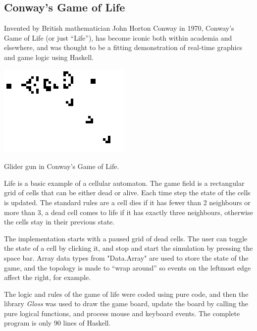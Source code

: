\subsection{Conway's Game of Life}

Invented by British mathematician John Horton Conway in 1970, Conway's Game of Life (or just ``Life''), has become iconic both within academia and elsewhere, and was thought to be a fitting demonstration of real-time graphics and game logic using Haskell. 

\begin{marginfigure}
	\includegraphics{res/conway/conway.png}
	\caption[Glider gun in Conway's Game of Life]{Glider gun in Conway's Game of Life.}
	\label{fig:glidergun}
\end{marginfigure}

Life is a basic example of a cellular automaton. The game field is a rectangular grid of cells that can be either dead or alive. Each time step the state of the cells is updated. The standard rules are a cell dies if it has fewer than 2 neighbours or more than 3, a dead cell comes to life if it has exactly three neighbours, otherwise the cells stay in their previous state.

The implementation starts with a paused grid of dead cells. The user can toggle the state of a cell by clicking it, and stop and start the simulation by pressing the space bar. Array data types from "Data.Array" are used to store the state of the game, and the topology is made to ``wrap around'' so events on the leftmost edge affect the right, for example.

The logic and rules of the game of life were coded using pure code, and then the library \emph{Gloss} was used to draw the game board, update the board by calling the pure logical functions, and process mouse and keyboard events. The complete program is only 90 lines of Haskell.

